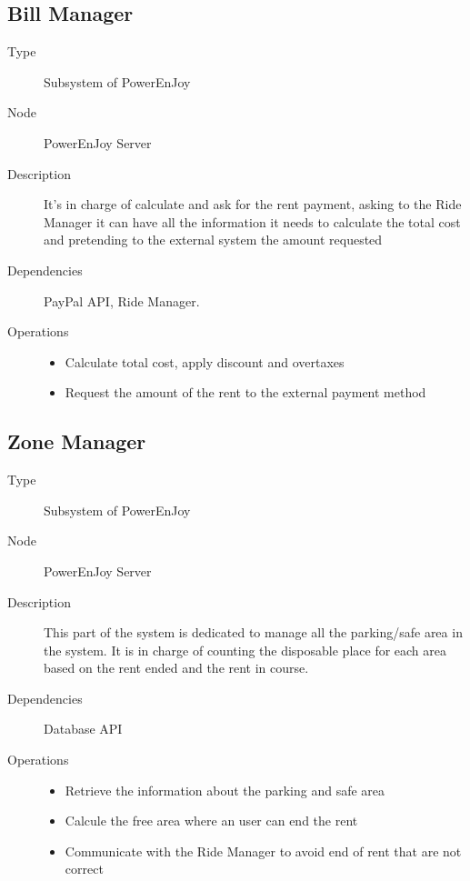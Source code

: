 \subsection{Bill Manager}
\begin{description}
	\item[Type] Subsystem of PowerEnJoy
	\item[Node] PowerEnJoy Server
	\item[Description] It's in charge of calculate and ask for the rent payment, asking to the Ride Manager it can have all the information it needs to calculate the total cost and pretending to the external system the amount requested
	\item[Dependencies] PayPal API, Ride Manager.
	\item[Operations] 
		\begin{itemize}
			\item Calculate total cost, apply discount and overtaxes 
			\item Request the amount of the rent to the external payment method 
		\end{itemize}
\end{description}

\subsection{Zone Manager}
\begin{description}
	\item[Type] Subsystem of PowerEnJoy
	\item[Node] PowerEnJoy Server
	\item[Description] This part of the system is dedicated to manage all the parking/safe area in the system. It is in charge of counting the disposable place for each area based on the rent ended and the rent in course. 
	\item[Dependencies] Database API
	\item[Operations] 
		\begin{itemize}
			\item Retrieve the information about the parking and safe area
			\item Calcule the free area where an user can end the rent 
			\item Communicate with the Ride Manager to avoid end of rent that are not correct
	\end{itemize}
\end{description}

